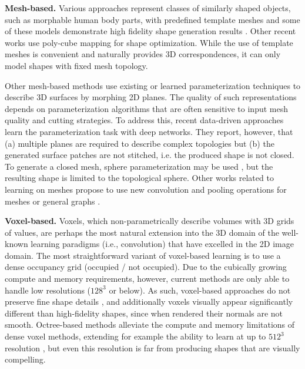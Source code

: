 \documentclass[10pt,twocolumn,letterpaper]{article}
\begin{document}
\noindent\textbf{Mesh-based.} Various approaches represent classes of similarly shaped objects, such as morphable human body parts, with predefined template meshes and some of these models demonstrate high fidelity shape generation results  \cite{bagautdinov2018modeling, litany2017deformable}. Other recent works \cite{baque2018geodesic} use poly-cube mapping \cite{tarini2004polycube} for shape optimization. While the use of template meshes is convenient and naturally provides 3D correspondences, it can only model shapes with fixed mesh topology. 

Other mesh-based methods use existing \cite{sinha2016deep,maron2017convolutional} or learned \cite{groueix2018atlasnet,hamu2018multi} parameterization techniques to describe 3D surfaces by morphing 2D planes. The quality of such representations depends on parameterization algorithms that are often sensitive to input mesh quality and cutting strategies. To address this, recent data-driven approaches \cite{yang2017foldingnet, groueix2018atlasnet} learn the parameterization task with deep networks. They report, however, that (a) multiple planes are required to describe complex topologies but (b) the generated surface patches are not stitched, i.e. the produced shape is not closed. To generate a closed mesh, sphere parameterization may be used \cite{groueix2018atlasnet,hamu2018multi}, but the resulting shape is limited to the topological sphere. Other works related to learning on meshes propose to use new convolution and pooling operations for meshes \cite{defferrard2016convolutional, verma2018feastnet} or general graphs \cite{bruna2013spectral}. 

\noindent\textbf{Voxel-based.} Voxels, which non-parametrically describe volumes with 3D grids of values, are perhaps the most natural extension into the 3D domain of the well-known learning paradigms (i.e., convolution) that have excelled in the 2D image domain.  
The most straightforward variant of voxel-based learning is to use a dense occupancy grid (occupied / not occupied). 
Due to the cubically growing compute and memory requirements, however, current methods are only able to handle low resolutions ($128^3$ or below). As such, voxel-based approaches do not preserve fine shape details \cite{wu20153d, choy20163d}, and additionally voxels visually appear significantly different than high-fidelity shapes, since when rendered their normals are not smooth. Octree-based methods \cite{ogn2017,riegler2017octnet,hane2017hierarchical} alleviate the compute and memory limitations of dense voxel methods, extending for example the ability to learn at up to $512^3$ resolution \cite{ogn2017}, but even this resolution is far from producing shapes that are visually compelling. 
\end{document}
